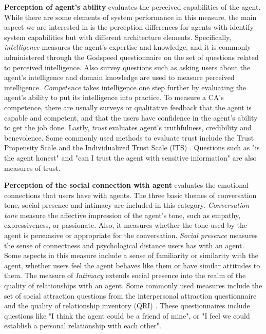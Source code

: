 \documentclass[sigconf,screen,review, anonymous]{acmart}
\newcommand{\cmt}[1]{}%
\begin{document}
\textbf{Perception of agent's ability} evaluates the perceived capabilities of the agent. While there are some elements of system performance in this measure, the main aspect we are interested in is the perception differences for agents with identify system capabilities but with different architecture elements. Specifically, \textit{intelligence} measures the agent's expertise and knowledge, and it is commonly administered through the Godspeed questionnaire \cite{bartneck2009measurement}\cmt{godspeed} on the set of questions related to perceived intelligence. Also survey questions such as asking users about the agent's intelligence and domain knowledge are used to measure perceived intelligence. \textit{Competence} takes intelligence one step further by evaluating the agent's ability to put its intelligence into practice. To measure a CA's competence, there are usually surveys or qualitative feedback that the agent is capable and competent, and that the users have confidence in the agent's ability to get the job done. Lastly, \textit{trust} evaluates agent's truthfulness, credibility and benevolence. Some commonly used methods to evaluate trust include the Trust Propensity Scale \cite{mayer1999effect} and the Individualized Trust Scale (ITS) \cite{wheeless1977measurement}. Questions such as "is the agent honest" and "can I trust the agent with sensitive information" are also measures of trust.

\textbf{Perception of the social connection with agent} evaluates the emotional connections that users have with agents. The three basic themes of conversation tone, social presence and intimacy are included in this category. \textit{Conversation tone} measure the affective impression of the agent's tone, such as empathy, expressiveness, or passionate. Also, it measures whether the tone used by the agent is persuasive or appropriate for the conversation. \textit{Social presence} measures the sense of connectness and psychological distance users has with an agent. Some aspects in this measure include a sense of familiarity or similarity with the agent, whether users feel the agent behaves like them or have similar attitudes to them. The measure of \textit{Intimacy} extends social presence into the realm of the quality of relationships with an agent. Some commonly used measures include the set of social attraction questions from the interpersonal attraction questionnaire \cite{mccroskey1975development} and the quality of relationship inventory (QRI) \cite{pierce1997assessing}. These questionnaires include questions like "I think the agent could be a friend of mine", or "I feel we could establish a personal relationship with each other".
\end{document}
